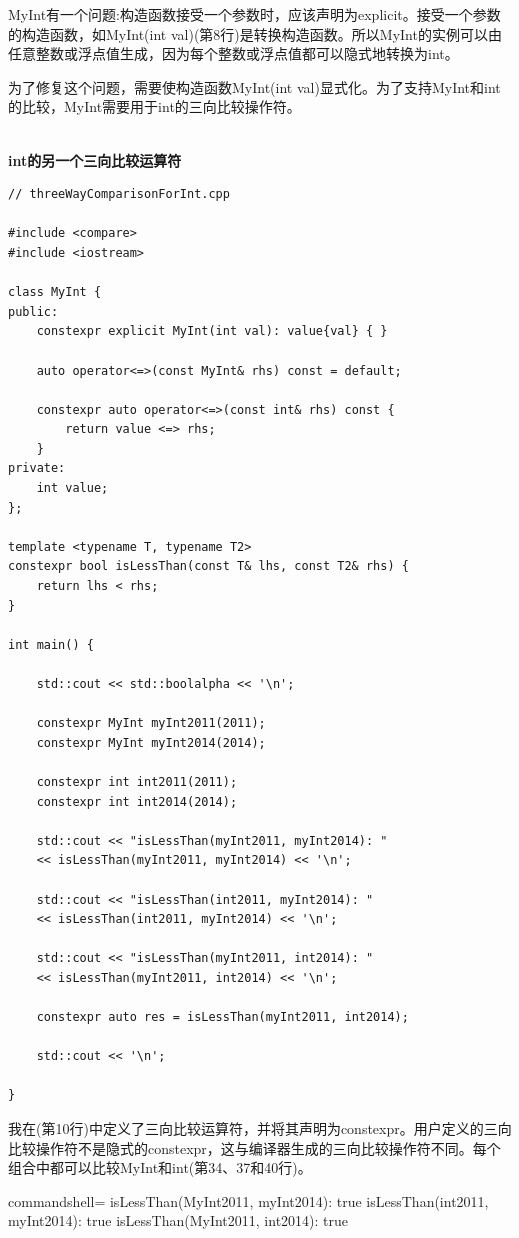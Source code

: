 MyInt有一个问题:构造函数接受一个参数时，应该声明为explicit。接受一个参数的构造函数，如MyInt(int val)(第8行)是转换构造函数。所以MyInt的实例可以由任意整数或浮点值生成，因为每个整数或浮点值都可以隐式地转换为int。

为了修复这个问题，需要使构造函数MyInt(int val)显式化。为了支持MyInt和int的比较，MyInt需要用于int的三向比较操作符。

\hspace*{\fill} \\ %
\noindent
\textbf{int的另一个三向比较运算符}
\begin{lstlisting}[style=styleCXX]
// threeWayComparisonForInt.cpp

#include <compare>
#include <iostream>

class MyInt {
public:
	constexpr explicit MyInt(int val): value{val} { }
	
	auto operator<=>(const MyInt& rhs) const = default;
	
	constexpr auto operator<=>(const int& rhs) const {
		return value <=> rhs;
	}
private:
	int value;
};

template <typename T, typename T2>
constexpr bool isLessThan(const T& lhs, const T2& rhs) {
	return lhs < rhs;
}

int main() {

	std::cout << std::boolalpha << '\n';
	
	constexpr MyInt myInt2011(2011);
	constexpr MyInt myInt2014(2014);
	
	constexpr int int2011(2011);
	constexpr int int2014(2014);
	
	std::cout << "isLessThan(myInt2011, myInt2014): "
	<< isLessThan(myInt2011, myInt2014) << '\n';
	
	std::cout << "isLessThan(int2011, myInt2014): "
	<< isLessThan(int2011, myInt2014) << '\n';
	
	std::cout << "isLessThan(myInt2011, int2014): "
	<< isLessThan(myInt2011, int2014) << '\n';
	
	constexpr auto res = isLessThan(myInt2011, int2014);
	
	std::cout << '\n';

}
\end{lstlisting}

我在(第10行)中定义了三向比较运算符，并将其声明为constexpr。用户定义的三向比较操作符不是隐式的constexpr，这与编译器生成的三向比较操作符不同。每个组合中都可以比较MyInt和int(第34、37和40行)。

\begin{tcblisting}{commandshell={}}
isLessThan(MyInt2011, myInt2014): true
isLessThan(int2011, myInt2014): true
isLessThan(MyInt2011, int2014): true
\end{tcblisting}

